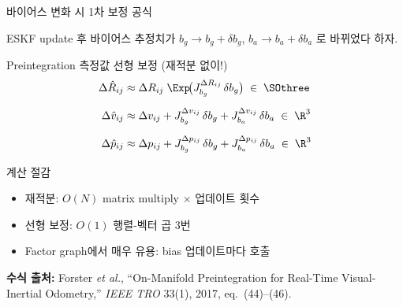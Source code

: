 \begin{frame}{바이어스 변화 시 1차 보정 공식}

  ESKF update 후 바이어스 추정치가
  $b_g \to b_g + \delta b_g$,\; $b_a \to b_a + \delta b_a$\; 로 바뀌었다 하자.

  \pause
  \vspace{0.4em}
  \begin{alertblock}{Preintegration 측정값 선형 보정 (재적분 없이!)}
    \begin{align*}
      \Delta\hat{R}_{ij}
        &\approx \Delta R_{ij}\;\Exp\!\bigl(J_{b_g}^{\Delta R_{ij}}\,\delta b_g\bigr)
        \;\in\;\SOthree \\[6pt]
      \Delta\hat{v}_{ij}
        &\approx \Delta v_{ij}
          + J_{b_g}^{\Delta v_{ij}}\,\delta b_g
          + J_{b_a}^{\Delta v_{ij}}\,\delta b_a
        \;\in\;\R^3 \\[6pt]
      \Delta\hat{p}_{ij}
        &\approx \Delta p_{ij}
          + J_{b_g}^{\Delta p_{ij}}\,\delta b_g
          + J_{b_a}^{\Delta p_{ij}}\,\delta b_a
        \;\in\;\R^3
    \end{align*}
  \end{alertblock}

  \pause
  \begin{exampleblock}{계산 절감}
    \begin{itemize}
      \item 재적분: $O(N)$ matrix multiply $\times$ 업데이트 횟수
      \item 선형 보정: $O(1)$ 행렬-벡터 곱 3번
      \item Factor graph에서 매우 유용: bias 업데이트마다 호출
    \end{itemize}
  \end{exampleblock}

  \pause
  \vspace{0.2em}
  \footnotesize
  \textbf{수식 출처:} Forster \textit{et al.}, ``On-Manifold Preintegration for Real-Time
  Visual-Inertial Odometry,'' \textit{IEEE TRO} 33(1), 2017, eq.~(44)--(46).
\end{frame}


